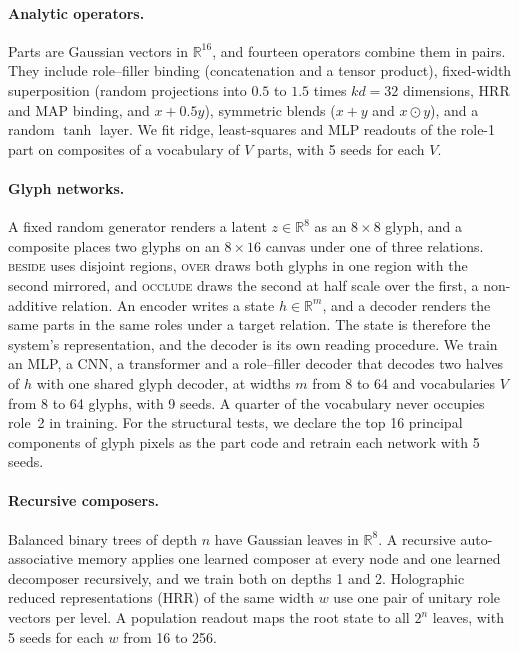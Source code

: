 \documentclass[10pt]{article}
\theoremstyle{plain}
\theoremstyle{remark}
\newcommand{\R}{\mathbb{R}}
\begin{document}
\paragraph{Analytic operators.} Parts are Gaussian vectors in $\R^{16}$, and fourteen operators combine them in pairs. They include role--filler binding (concatenation and a tensor product), fixed-width superposition (random projections into $0.5$ to $1.5$ times $kd = 32$ dimensions, HRR and MAP binding, and $x + 0.5y$), symmetric blends ($x + y$ and $x \odot y$), and a random $\tanh$ layer. We fit ridge, least-squares and MLP readouts of the role-1 part on composites of a vocabulary of $V$ parts, with 5 seeds for each $V$.

\paragraph{Glyph networks.} A fixed random generator renders a latent $z \in \R^{8}$ as an $8 \times 8$ glyph, and a composite places two glyphs on an $8 \times 16$ canvas under one of three relations. \textsc{beside} uses disjoint regions, \textsc{over} draws both glyphs in one region with the second mirrored, and \textsc{occlude} draws the second at half scale over the first, a non-additive relation. An encoder writes a state $h \in \R^m$, and a decoder renders the same parts in the same roles under a target relation. The state is therefore the system's representation, and the decoder is its own reading procedure. We train an MLP, a CNN, a transformer and a role--filler decoder that decodes two halves of $h$ with one shared glyph decoder, at widths $m$ from 8 to 64 and vocabularies $V$ from 8 to 64 glyphs, with 9 seeds. A quarter of the vocabulary never occupies role~2 in training. For the structural tests, we declare the top 16 principal components of glyph pixels as the part code and retrain each network with 5 seeds.

\paragraph{Recursive composers.} Balanced binary trees of depth $n$ have Gaussian leaves in $\R^8$. A recursive auto-associative memory \citep{pollack1990} applies one learned composer at every node and one learned decomposer recursively, and we train both on depths 1 and 2. Holographic reduced representations (HRR) of the same width $w$ use one pair of unitary role vectors per level. A population readout maps the root state to all $2^n$ leaves, with 5 seeds for each $w$ from 16 to 256.
\end{document}
